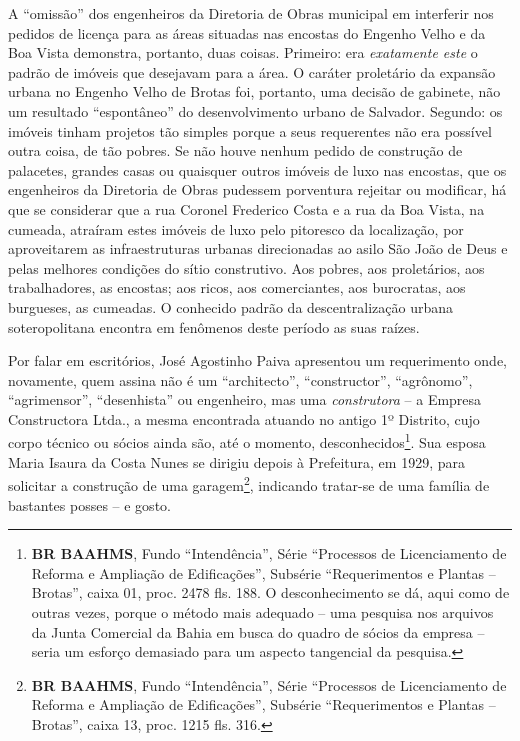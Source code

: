 A ``omissão'' dos engenheiros da Diretoria de Obras municipal em interferir nos pedidos de licença para as áreas situadas nas encostas do Engenho Velho e da Boa Vista demonstra, portanto, duas coisas. Primeiro: era \textit{exatamente este} o padrão de imóveis que desejavam para a área. O caráter proletário da expansão urbana no Engenho Velho de Brotas foi, portanto, uma decisão de gabinete, não um resultado ``espontâneo'' do desenvolvimento urbano de Salvador. Segundo: os imóveis tinham projetos tão simples porque a seus requerentes não era possível outra coisa, de tão pobres. Se não houve nenhum pedido de construção de palacetes, grandes casas ou quaisquer outros imóveis de luxo nas encostas, que os engenheiros da Diretoria de Obras pudessem porventura rejeitar ou modificar, há que se considerar que a rua Coronel Frederico Costa e a rua da Boa Vista, na cumeada, atraíram estes imóveis de luxo pelo pitoresco da localização, por aproveitarem as infraestruturas urbanas direcionadas ao asilo São João de Deus e pelas melhores condições do sítio construtivo. Aos pobres, aos proletários, aos trabalhadores, as encostas; aos ricos, aos comerciantes, aos burocratas, aos burgueses, as cumeadas. O conhecido padrão da descentralização urbana soteropolitana encontra em fenômenos deste período as suas raízes.


Por falar em escritórios, José Agostinho Paiva apresentou um requerimento onde, novamente, quem assina não é um ``architecto'', ``constructor'', ``agrônomo'', ``agrimensor'', ``desenhista'' ou engenheiro, mas uma \textit{construtora} -- a Empresa Constructora Ltda., a mesma encontrada atuando no antigo 1º Distrito, cujo corpo técnico ou sócios ainda são, até o momento, desconhecidos\footnote{\textbf{BR BAAHMS}, Fundo ``Intendência'', Série ``Processos de Licenciamento de Reforma e Ampliação de Edificações'', Subsérie ``Requerimentos e Plantas -- Brotas'', caixa 01, proc. 2478 fls. 188. O desconhecimento se dá, aqui como de outras vezes, porque o método mais adequado -- uma pesquisa nos arquivos da Junta Comercial da Bahia em busca do quadro de sócios da empresa -- seria um esforço demasiado para um aspecto tangencial da pesquisa.}. Sua esposa Maria Isaura da Costa Nunes se dirigiu depois à Prefeitura, em 1929, para solicitar a construção de uma garagem\footnote{\textbf{BR BAAHMS}, Fundo ``Intendência'', Série ``Processos de Licenciamento de Reforma e Ampliação de Edificações'', Subsérie ``Requerimentos e Plantas -- Brotas'', caixa 13, proc. 1215 fls. 316.}, indicando tratar-se de uma família de bastantes posses -- e gosto.

